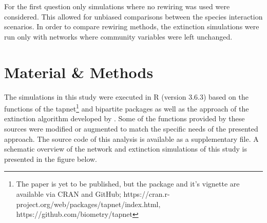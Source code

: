 \documentclass[12pt,a4paper]{article}
\begin{document}
For the first question only simulations where no rewiring was used were considered. This allowed for unbiased comparisons between the species interaction scenarios. In order to compare rewiring methods, the extinction simulations were run only with networks where community variables were left unchanged.



%	


	\section{Material \& Methods}
	The simulations in this study were executed in R \parencite{Rcore} (version 3.6.3) based on the functions of the tapnet\footnote{The paper is yet to be published, but the package and it's vignette are available via CRAN and GitHub; https://cran.r-project.org/web/packages/tapnet/index.html, https://github.com/biometry/tapnet} \parencite{Benadi} and bipartite \parencite{Dormann2008} packages as well as the approach of the extinction algorithm developed by \citeauthor{Vizentin-Bugoni2019} \parencite{Vizentin-Bugoni2019}. Some of the functions provided by these sources were modified or augmented to match the specific needs of the presented approach. The source code of this analysis is available as a supplementary file. A schematic overview of the network and extinction simulations of this study is presented in the figure below.	
	
\end{document}
